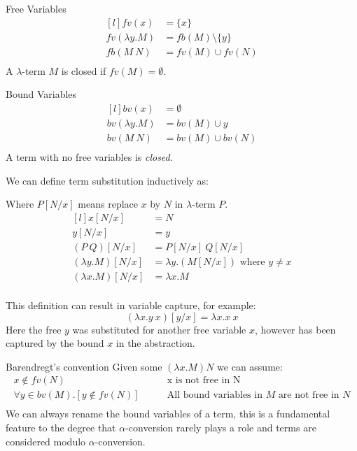 \begin{tcbraster}[raster columns=2, raster equal height]
	\begin{definitionbox}{Free Variables}
		\[\begin{matrix*}[l]
				fv(x) & = \{x\} \\
				fv(\lambda y . M) & = fb(M) \setminus \{y\} \\
				fb(M \ N) &= fv(M) \cup fv(N) \\
			\end{matrix*}\]
		A $\lambda$-term $M$ is closed if $fv(M) = \emptyset$.
	\end{definitionbox}
	\begin{definitionbox}{Bound Variables}
		\[\begin{matrix*}[l]
				bv(x) &= \emptyset \\
				bv(\lambda y . M) &= bv(M) \cup y \\
				bv(M \ N) &= bv(M) \cup bv(N) \\
			\end{matrix*}\]
		A term with no free variables is \textit{closed}.
	\end{definitionbox}
\end{tcbraster}
We can define term substitution inductively as:
\\ \begin{minipage}{.45\textwidth}
	Where $P[N/x]$ means replace $x$ by $N$ in $\lambda$-term $P$.
	\[\begin{matrix*}[l]
			x[N/x] & = N \\
			y[N/x] & = y \\
			(P \ Q)[N/x] & = P[N/x] \ Q[N/x] \\
			(\lambda y . M)[N/x] &= \lambda y.(M[N/x]) \text{ where } y \neq x \\
			(\lambda x . M)[N/x] &= \lambda x.M \\
		\end{matrix*}\]
\end{minipage}
\begin{minipage}{.55\textwidth}
	This definition can result in variable capture, for example:
	\[(\lambda x . y \ x) [y/x] = \lambda x . x \ x\]
	Here the free $y$ was substituted for another free variable $x$, however has been captured by the bound $x$ in the abstraction.
\end{minipage}
\begin{definitionbox}{Barendregt's convention}
	Given some $(\lambda x . M) N$ we can assume:
	\[\begin{split}
			x \not\in fv(N) & \qquad \text{x is not free in N} \\
			\forall y \in bv(M) . [y \not\in fv(N)] & \qquad \text{All bound variables in }M\text{ are not free in }N \\
		\end{split}\]
	We can always rename the bound variables of a term, this is a fundamental feature to the degree that $\alpha$-conversion rarely plays a role and terms are considered modulo $\alpha$-conversion.
\end{definitionbox}

